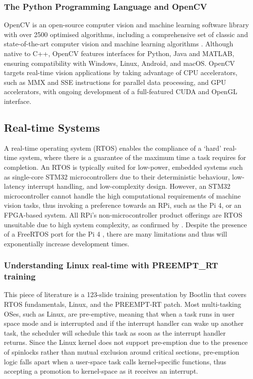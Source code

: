 \subsubsection{The Python Programming Language and OpenCV}
OpenCV is an open-source computer vision and machine learning software library with over 2500 optimised algorithms, including a comprehensive set of classic and state-of-the-art computer vision and machine learning algorithms \cite{opencv}. Although native to C++, OpenCV features interfaces for Python, Java and MATLAB, ensuring compatibility with Windows, Linux, Android, and macOS. OpenCV targets real-time vision applications by taking advantage of CPU accelerators, such as MMX and SSE instructions for parallel data processing, and GPU accelerators, with ongoing development of a full-featured CUDA and OpenGL interface.

\subsection{Real-time Systems}
A real-time operating system (RTOS) enables the compliance of a `hard' real-time system, where there is a guarantee of the maximum time a task requires for completion. An RTOS is typically suited for low-power, embedded systems such as single-core STM32 microcontrollers due to their deterministic behaviour, low-latency interrupt handling, and low-complexity design. However, an STM32 microcontroller cannot handle the high computational requirements of machine vision tasks, thus invoking a preference towards an RPi, such as the Pi 4, or an FPGA-based system. All RPi's non-microcontroller product offerings are RTOS unsuitable due to high system complexity, as confirmed by \cite{FreeRTOSRaspberry2022}. Despite the presence of a FreeRTOS port for the Pi 4 \cite{timadaTImadaRaspi4_freertos2024}, there are many limitations and thus will exponentially increase development times.

\subsubsection{Understanding Linux real-time with PREEMPT\_RT training \cite{bootlinUnderstandingLinuxRealtime2024}}
This piece of literature is a 123-slide training presentation by Bootlin that covers RTOS fundamentals, Linux, and the PREEMPT-RT patch. Most multi-tasking OSes, such as Linux, are pre-emptive, meaning that when a task runs in user space mode and is interrupted and if the interrupt handler can wake up another task, the scheduler will schedule this task as soon as the interrupt handler returns. Since the Linux kernel does not support pre-emption due to the presence of spinlocks rather than mutual exclusion around critical sections, pre-emption logic falls apart when a user-space task calls kernel-specific functions, thus accepting a promotion to kernel-space as it receives an interrupt.

